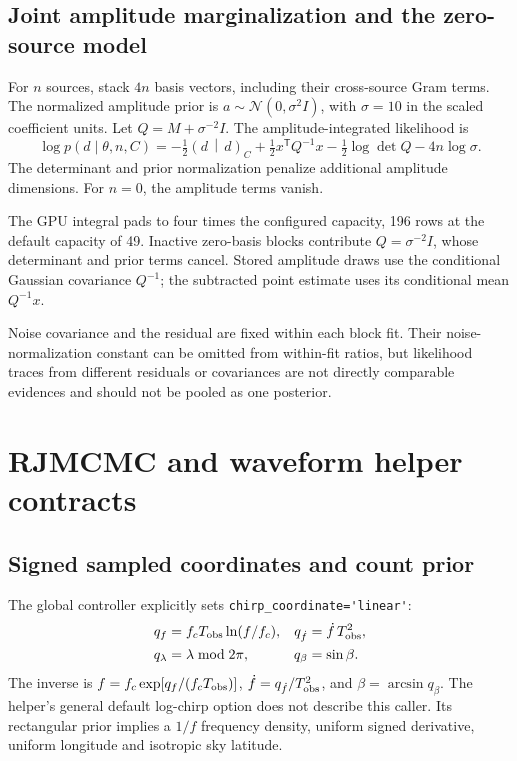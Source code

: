\documentclass[11pt,a4paper]{article}
\newcommand{\code}[1]{\texttt{\nolinkurl{#1}}}
\newcommand{\ip}[2]{\left(#1\,\middle|\,#2\right)}
\begin{document}
\subsection{Joint amplitude marginalization and the zero-source model}

For \(n\) sources, stack \(4n\) basis vectors, including their cross-source
Gram terms. The normalized amplitude prior is
\(a\sim\mathcal N(0,\sigma^2 I)\), with \(\sigma=10\) in the scaled coefficient
units. Let \(Q=M+\sigma^{-2}I\). The amplitude-integrated likelihood is
\begin{equation}
\log p(d\mid\theta,n,C)
=-\tfrac12\ip{d}{d}_C+\tfrac12x^\mathsf TQ^{-1}x
 -\tfrac12\log\det Q-4n\log\sigma.
\label{eq:marginal}
\end{equation}
The determinant and prior normalization penalize additional amplitude
dimensions. For \(n=0\), the amplitude terms vanish.

The GPU integral pads to four times the configured capacity, 196 rows at the
default capacity of 49. Inactive zero-basis blocks contribute
\(Q=\sigma^{-2}I\), whose determinant and prior terms cancel. Stored amplitude
draws use the conditional Gaussian covariance \(Q^{-1}\); the subtracted
point estimate uses its conditional mean \(Q^{-1}x\).

Noise covariance and the residual are fixed within each block fit. Their
noise-normalization constant can be omitted from within-fit ratios, but
likelihood traces from different residuals or covariances are not directly
comparable evidences and should not be pooled as one posterior.

\section{RJMCMC and waveform helper contracts}
\label{sec:sampler}

\subsection{Signed sampled coordinates and count prior}

The global controller explicitly sets \code{chirp_coordinate='linear'}:
\begin{align}
q_f&=f_cT_{\rm obs}\ln(f/f_c),&
q_{\dot f}&=\dot f\,T_{\rm obs}^2,\\
q_\lambda&=\lambda\bmod2\pi,&q_\beta&=\sin\beta.
\end{align}
The inverse is \(f=f_c\exp[q_f/(f_cT_{\rm obs})]\),
\(\dot f=q_{\dot f}/T_{\rm obs}^2\), and \(\beta=\arcsin q_\beta\).
The helper's general default log-chirp option does not describe this caller.
Its rectangular prior implies a \(1/f\) frequency density, uniform signed
derivative, uniform longitude and isotropic sky latitude.
\end{document}
